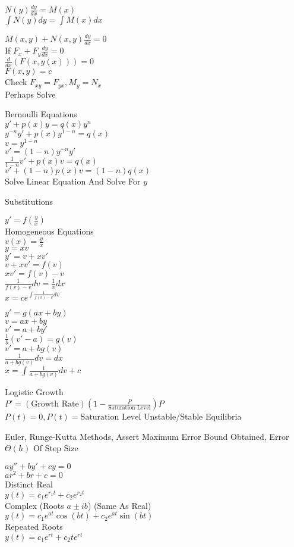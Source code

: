 $N(y)\frac{dy}{dx}=M(x)$ \\
$\int N(y)dy=\int M(x) dx$

$M(x,y)+N(x,y)\frac{dy}{dx}=0$ \\
If $F_x+F_y \frac{dy}{dx}=0$ \\
$\frac{d}{dx}(F(x,y(x)))=0$ \\
$F(x,y)=c$ \\
Check $F_{xy}=F_{yx},M_y=N_x$ \\
Perhaps Solve

Bernoulli Equations \\
$y'+p(x)y=q(x)y^n$ \\
$y^{-n}y'+p(x)y^{1-n}=q(x)$ \\
$v=y^{1-n}$ \\
$v'=(1-n)y^{-n}y'$ \\
$\frac{1}{1-n}v'+p(x)v=q(x)$ \\
$v'+(1-n)p(x)v=(1-n)q(x)$ \\
Solve Linear Equation And Solve For $y$

Substitutions

$y'=f\left(\frac{y}{x} \right)$ \\
Homogeneous Equations \\
$v(x)=\frac{y}{x}$ \\
$y=xv$ \\
$y'=v+xv'$ \\
$v+xv'=f(v)$ \\
$xv'=f(v)-v$ \\
$\frac{1}{f(v)-v} dv=\frac{1}{x}dx$ \\
$x=ce^{\int \frac{1}{f(v)-v} dv}$

$y'=g(ax+by)$ \\
$v=ax+by$ \\
$v'=a+by'$ \\
$\frac{1}{b}(v'-a)=g(v)$ \\
$v'=a+bg(v)$ \\
$\frac{1}{a+bg(v)}dv=dx$ \\
$x=\int \frac{1}{a+bg(v)} dv +c$

Logistic Growth \\
$P'=(\text{Growth Rate})\left(1-\frac{P}{\text{Saturation Level}} \right)P$ \\
$P(t)=0,P(t)=\text{Saturation Level}$ Unstable/Stable Equilibria

Euler, Runge-Kutta Methods, Assert Maximum Error Bound Obtained, Error $\Theta(h)$ Of Step Size

$ay''+by'+cy=0$ \\
$ar^2+br+c=0$ \\
Distinct Real \\
$y(t)=c_1 e^{r_1 t}+c_2 e^{r_2 t}$ \\
Complex (Roots $a \pm ib$) (Same As Real) \\
$y(t)=c_1 e^{at} \cos(bt) + c_2 e^{at} \sin(bt)$ \\
Repeated Roots \\
$y(t)=c_1 e^{rt} + c_2 t e^{rt}$

